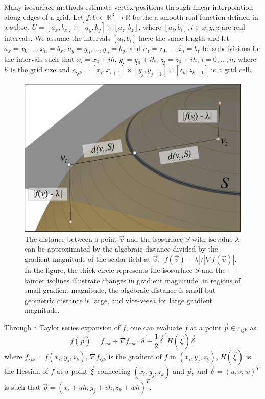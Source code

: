 Many isosurface methods estimate vertex positions through linear
interpolation along edges of a grid.
Let $f:U\subset\mathbb{R}^3 \rightarrow \mathbb{R}$ be the a smooth 
real function defined in a 
subset $U=[a_x,b_x]\times[a_y,b_y]\times[a_z,b_z]$, where $[a_i,b_i], i \in {x,y,z}$ 
are real intervals.
We assume the intervals $[a_i,b_i]$ have the same length and 
let $a_x=x_0,\ldots,x_n=b_x$, $a_y=y_0,\ldots,y_n=b_y$, and
$a_z=z_0,\ldots,z_n=b_z$ be subdivisions for the intervals such that
$x_i = x_0+ih$, $y_i = y_0+ih$, $z_i = z_0+ih,\, i=0,\ldots,n$, 
where $h$ is the grid size and 
$c_{ijk}=[x_i,x_{i+1}]\times[y_j,y_{j+1}]\times[z_k,z_{k+1}]$
is a grid cell. 
\begin{figure}[h]
\centering
\includegraphics[width=.75\linewidth]{chapter2/figures/algebraic.pdf}
\caption{The distance between a point $\vec{v}$ and the isosurface $S$
  with isovalue $\lambda$ can be approximated by the algebraic
  distance divided by the gradient magnitude of the scalar field at $\vec{v}$,
  $|f(\vec{v})-\lambda| / |\nabla f(\vec{v})|$. In the figure, the
  thick circle represents the isosurface $S$ and the fainter isolines
  illustrate changes in gradient magnitude: in regions of small
  gradient magnitude, the algebraic distance is small but geometric
  distance is large, and vice-versa for large gradient magnitude.}
\label{fig:algebraic-distance}
\end{figure}
Through a Taylor series expansion of $f$, one can evaluate $f$ 
at a point $\vec{p}\in c_{ijk}$ as:
\begin{equation}
f(\vec{p}) = f_{ijk} + \nabla f_{ijk}\cdot \vec{\delta} + \frac{1}{2}\vec{\delta}^T H(\vec{\xi}) \vec{\delta}
\label{eq:taylor}
\end{equation}
\noindent where $f_{ijk}=f(x_i,y_j,z_k)$, $\nabla f_{ijk}$ is the gradient 
of $f$ in $(x_i,y_j,z_k)$,
$H(\vec{\xi})$ is the Hessian of $f$ at a point $\vec{\xi}$ 
connecting $(x_i,y_j,z_k)$ and $\vec{p}$, 
and $\vec{\delta} = (u,v,w)^T$ is such that $\vec{p} = (x_i+uh,y_j+vh,z_k+wh)^T$.

